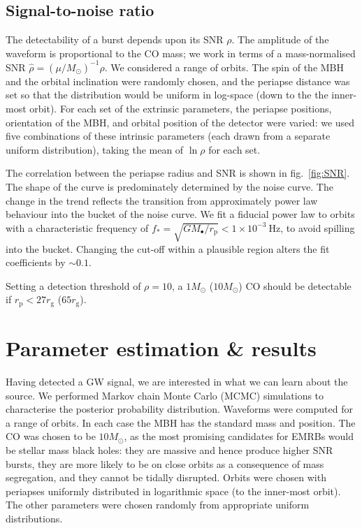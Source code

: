 \documentclass[11pt,twoside]{article}
\begin{document}
\subsection{Signal-to-noise ratio}

The detectability of a burst depends upon its SNR $\rho$. The amplitude of the waveform is proportional to the CO mass; we work in terms of a mass-normalised SNR $\hat{\rho} = (\mu/M_\odot)^{-1}\rho$. We considered a range of orbits. The spin of the MBH and the orbital inclination were randomly chosen, and the periapse distance was set so that the distribution would be uniform in log-space (down to the the inner-most orbit). For each set of the extrinsic parameters, the periapse positions, orientation of the MBH, and orbital position of the detector were varied: we used five combinations of these intrinsic parameters (each drawn from a separate uniform distribution), taking the mean of $\ln \rho$ for each set.

The correlation between the periapse radius and SNR is shown in fig.~\ref{fig:SNR}.
The shape of the curve is predominately determined by the noise curve. The change in the trend reflects the transition from approximately power law behaviour into the bucket of the noise curve. We fit a fiducial power law to orbits with a characteristic frequency of $f_\ast = \sqrt{GM_\bullet/r_\mathrm{p}} < 1 \times 10^{-3}~\mathrm{Hz}$, to avoid spilling into the bucket. Changing the cut-off within a plausible region alters the fit coefficients by $\sim 0.1$.

Setting a detection threshold of $\rho = 10$, a $1 M_\odot$ ($10 M_\odot$) CO should be detectable if $r_\mathrm{p} < 27 r_\mathrm{g}$ ($65 r_\mathrm{g}$).

\section{Parameter estimation \& results}\label{sec:Estimation}

Having detected a GW signal, we are interested in what we can learn about the source. We performed Markov chain Monte Carlo (MCMC) simulations to characterise the posterior probability distribution. Waveforms were computed for a range of orbits. In each case the MBH has the standard mass and position. The CO was chosen to be $10 M_\odot$, as the most promising candidates for EMRBs would be stellar mass black holes: they are massive and hence produce higher SNR bursts, they are more likely to be on close orbits as a consequence of mass segregation, and they cannot be tidally disrupted. Orbits were chosen with periapses uniformly distributed in logarithmic space (to the inner-most orbit). The other parameters were chosen randomly from appropriate uniform distributions. 
\end{document}
